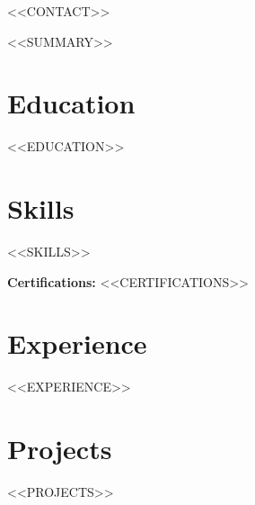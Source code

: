 \documentclass[10pt,letterpaper]{article}
\newenvironment{resumeItemize}{
    \begin{itemize}[
        leftmargin=0.17in,
        label={},
        itemsep=0.5pt,
        topsep=0.5pt,
        parsep=0pt,
        partopsep=0pt
    ]
}{
    \end{itemize}
}
\begin{document}

<<CONTACT>>

\vspace{-2pt}


<<SUMMARY>>

\vspace{-1pt}


\section*{Education}

<<EDUCATION>>


\section*{Skills}

<<SKILLS>>

\small
\textbf{Certifications:}
\hspace{2pt}
<<CERTIFICATIONS>>



\section*{Experience}

<<EXPERIENCE>>



\section*{Projects}

\begin{resumeItemize}

<<PROJECTS>>

\end{resumeItemize}
\end{document}
